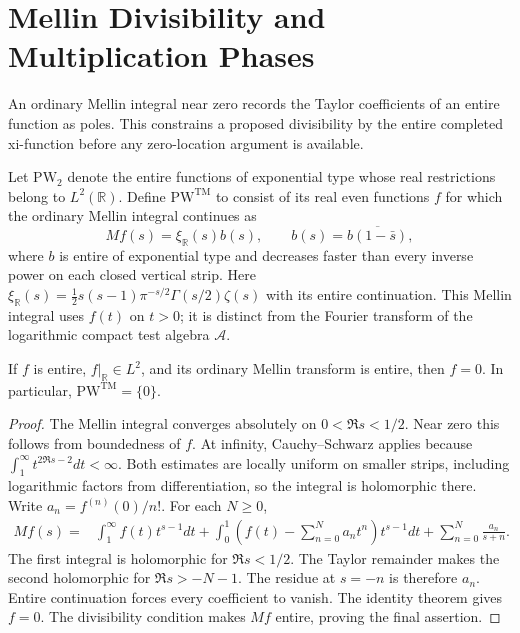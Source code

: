 \section{Mellin Divisibility and Multiplication Phases}
\label{v4-arith:w7-j:tate-mellin-closure}
\label{v4-arith:w7-j:sub-class}

An ordinary Mellin integral near zero records the Taylor
coefficients of an entire function as poles. This constrains a
proposed divisibility by the entire completed xi-function before
any zero-location argument is available.

\begin{definition}
\label{v4-arith:w7-j:def:TM-subclass}
Let \(\mathrm{PW}_2\) denote the entire functions of exponential
type whose real restrictions belong to \(L^2(\mathbb R)\).
Define \(\mathrm{PW}^{\mathrm{TM}}\) to consist of its real even
functions \(f\) for which the ordinary Mellin integral continues as
\[
 Mf(s)=\xi_{\mathbb R}(s)b(s),\qquad
 b(s)=\overline{b(1-\bar s)},
\]
where \(b\) is entire of exponential type and decreases faster than
every inverse power on each closed vertical strip. Here
\(\xi_{\mathbb R}(s)=\tfrac12s(s-1)\pi^{-s/2}\Gamma(s/2)\zeta(s)\)
with its entire continuation. This Mellin integral uses \(f(t)\)
on \(t>0\); it is distinct from the Fourier transform of the
logarithmic compact test algebra \(\mathscr A\).
\end{definition}

\begin{theorem}
\label{v4-arith:w7-j:thm:ATP-TM-closure}
If \(f\) is entire, \(f|_{\mathbb R}\in L^2\), and its ordinary
Mellin transform is entire, then \(f=0\).
In particular, \(\mathrm{PW}^{\mathrm{TM}}=\{0\}\).
\end{theorem}
\begin{proof}
The Mellin integral converges absolutely on \(0<\Re s<1/2\).
Near zero this follows from boundedness of \(f\). At infinity,
Cauchy--Schwarz applies because
\(\int_1^\infty t^{2\Re s-2}dt<\infty\).
Both estimates are locally uniform on smaller strips, including
logarithmic factors from differentiation, so the integral is
holomorphic there. Write \(a_n=f^{(n)}(0)/n!\). For each \(N\geq0\),
\[
 \begin{split}
 Mf(s)={}&\int_1^\infty f(t)t^{s-1}dt
 +\int_0^1\left(f(t)-\sum_{n=0}^Na_nt^n\right)t^{s-1}dt
 +\sum_{n=0}^N\frac{a_n}{s+n}.
 \end{split}
\]
The first integral is holomorphic for \(\Re s<1/2\).
The Taylor remainder makes the second holomorphic for
\(\Re s>-N-1\). The residue at \(s=-n\) is therefore \(a_n\).
Entire continuation forces every coefficient to vanish.
The identity theorem gives \(f=0\). The divisibility condition
makes \(Mf\) entire, proving the final assertion.
\end{proof}

